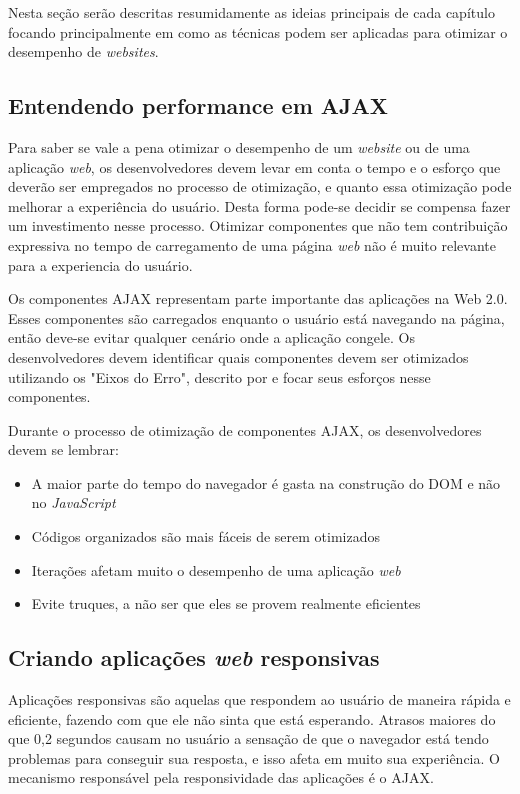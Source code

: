 Nesta seção serão descritas resumidamente as ideias principais de cada capítulo focando principalmente em como as técnicas podem ser aplicadas para otimizar o desempenho de \textit{websites}.

\subsection{Entendendo performance em AJAX}
\label{subsec:evenfaster_cap1}
Para saber se vale a pena otimizar o desempenho de um \textit{website} ou de uma aplicação \textit{web}, os desenvolvedores devem levar em conta o tempo e o esforço que deverão ser empregados no processo de otimização, e quanto essa otimização pode melhorar a experiência do usuário. Desta forma pode-se decidir se compensa fazer um investimento nesse processo. Otimizar componentes que não tem contribuição expressiva no tempo de carregamento de uma página \textit{web} não é muito relevante para a experiencia do usuário.

Os componentes AJAX representam parte importante das aplicações na Web 2.0. Esses componentes são carregados enquanto o usuário está navegando na página, então deve-se evitar qualquer cenário onde a aplicação congele. Os desenvolvedores devem identificar quais componentes devem ser otimizados utilizando os "Eixos do Erro", descrito por  e focar seus esforços nesse componentes.

Durante o processo de otimização de componentes AJAX, os desenvolvedores devem se lembrar:
\begin{itemize}
	\item A maior parte do tempo do navegador é gasta na construção do DOM e não no \textit{JavaScript}
	\item Códigos organizados são mais fáceis de serem otimizados
	\item Iterações afetam muito o desempenho de uma aplicação \textit{web}
	\item Evite truques, a não ser que eles se provem realmente eficientes
\end{itemize}

\subsection{Criando aplicações \textit{web} responsivas}
\label{subsec:evenfaster_cap2}
Aplicações responsivas são aquelas que respondem ao usuário de maneira rápida e eficiente, fazendo com que ele não sinta que está esperando. Atrasos maiores do que 0,2 segundos causam no usuário a sensação de que o navegador está tendo problemas para conseguir sua resposta, e isso afeta em muito sua experiência. O mecanismo responsável pela responsividade das aplicações é o AJAX.

